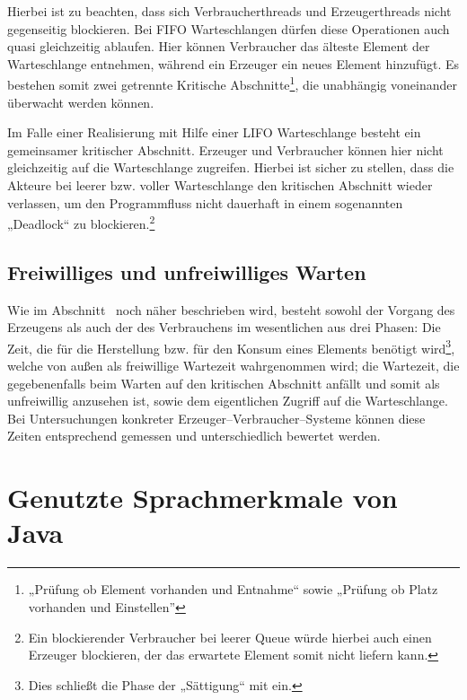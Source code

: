 Hierbei ist zu beachten, dass sich Verbraucherthreads und Erzeugerthreads nicht gegenseitig blockieren. Bei \ac{FIFO} Warteschlangen dürfen diese Operationen auch quasi gleichzeitig ablaufen. Hier können Verbraucher das älteste Element der Warteschlange entnehmen, während ein Erzeuger ein neues Element hinzufügt. Es bestehen somit zwei getrennte Kritische Abschnitte\footnote{„Prüfung ob Element vorhanden und Entnahme“ sowie „Prüfung ob Platz vorhanden und Einstellen”}, die unabhängig voneinander überwacht werden können.

Im Falle einer Realisierung mit Hilfe einer \ac{LIFO} Warteschlange besteht ein gemeinsamer kritischer Abschnitt. Erzeuger und Verbraucher können hier nicht gleichzeitig auf die Warteschlange zugreifen. Hierbei ist sicher zu stellen, dass die Akteure bei leerer bzw. voller Warteschlange den kritischen Abschnitt wieder verlassen, um den Programmfluss nicht dauerhaft in einem sogenannten „Deadlock“ zu blockieren.\footnote{Ein blockierender Verbraucher bei leerer Queue würde hierbei auch einen Erzeuger blockieren, der das erwartete Element somit nicht liefern kann.}

\subsection{Freiwilliges und unfreiwilliges Warten} %
\label{sub:freiwilliges_und_unfreiwilliges_warten}

Wie im Abschnitt~ noch näher beschrieben wird, besteht sowohl der Vorgang des Erzeugens als auch der des Verbrauchens im wesentlichen aus drei Phasen: Die Zeit, die für die Herstellung bzw. für den Konsum eines Elements benötigt wird\footnote{Dies schließt die Phase der „Sättigung“ mit ein.}, welche von außen als freiwillige Wartezeit wahrgenommen wird; die Wartezeit, die gegebenenfalls beim Warten auf den kritischen Abschnitt anfällt und somit als unfreiwillig anzusehen ist, sowie dem eigentlichen Zugriff auf die Warteschlange. Bei Untersuchungen konkreter Erzeuger–Verbraucher–Systeme können diese Zeiten entsprechend gemessen und unterschiedlich bewertet werden.



\newpage
\section{Genutzte Sprachmerkmale von Java} %
\label{sec:genutzte_sprachmerkmale_von_java}

